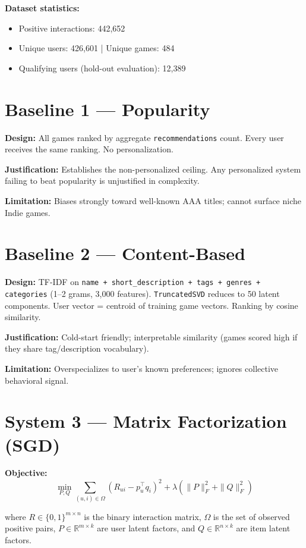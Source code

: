 \documentclass[11pt,a4paper]{article}
\begin{document}
\textbf{Dataset statistics:}
\begin{itemize}[leftmargin=*]
  \item Positive interactions: 442,652
  \item Unique users: 426,601 | Unique games: 484
  \item Qualifying users (hold-out evaluation): 12,389
\end{itemize}

\section{Baseline 1 --- Popularity}

\textbf{Design:} All games ranked by aggregate \texttt{recommendations} count. Every user receives the same ranking. No personalization.

\textbf{Justification:} Establishes the non-personalized ceiling. Any personalized system failing to beat popularity is unjustified in complexity.

\textbf{Limitation:} Biases strongly toward well-known AAA titles; cannot surface niche Indie games.

\section{Baseline 2 --- Content-Based}

\textbf{Design:} TF-IDF on \texttt{name + short\_description + tags + genres + categories} (1--2 grams, 3,000 features). \texttt{TruncatedSVD} reduces to 50 latent components. User vector = centroid of training game vectors. Ranking by cosine similarity.

\textbf{Justification:} Cold-start friendly; interpretable similarity (games scored high if they share tag/description vocabulary).

\textbf{Limitation:} Overspecializes to user's known preferences; ignores collective behavioral signal.

\section{System 3 --- Matrix Factorization (SGD)}

\textbf{Objective:}
\begin{equation}
\min_{P,Q} \sum_{(u,i) \in \Omega} \left(R_{ui} - p_u^\top q_i\right)^2 + \lambda \left(\|P\|_F^2 + \|Q\|_F^2\right)
\end{equation}

where $R \in \{0,1\}^{m \times n}$ is the binary interaction matrix, $\Omega$ is the set of observed positive pairs, $P \in \mathbb{R}^{m \times k}$ are user latent factors, and $Q \in \mathbb{R}^{n \times k}$ are item latent factors.
\end{document}
